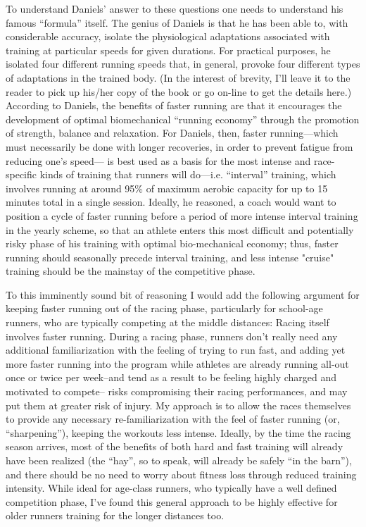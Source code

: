 To understand Daniels’ answer to these questions one needs to understand his famous “formula” itself. The genius of Daniels is that he has been able to, with considerable accuracy, isolate the physiological adaptations associated with training at particular speeds for given durations. For practical purposes, he isolated four different running speeds that, in general, provoke four different types of adaptations in the trained body. (In the interest of brevity, I’ll leave it to the reader to pick up his/her copy of the book or go on-line to get the details here.) According to Daniels, the benefits of faster running are that it encourages the development of optimal biomechanical “running economy” through the promotion of strength, balance and relaxation. For Daniels, then, faster running—which must necessarily be done with longer recoveries, in order to prevent fatigue from reducing one’s speed— is best used as a basis for the most intense and race-specific kinds of training that runners will do—i.e. “interval” training, which involves running at around 95\% of maximum aerobic capacity for up to 15 minutes total in a single session. Ideally, he reasoned, a coach would want to position a cycle of faster running before a period of more intense interval training in the yearly scheme, so that an athlete enters this most difficult and potentially risky phase of his training with optimal bio-mechanical economy; thus, faster running should seasonally precede interval training, and less intense "cruise" training should be the mainstay of the competitive phase.

To this imminently sound bit of reasoning I would add the following argument for keeping faster running out of the racing phase, particularly for school-age runners, who are typically competing at the middle distances: Racing itself involves faster running. During a racing phase, runners don’t really need any additional familiarization with the feeling of trying to run fast, and adding yet more faster running into the program while athletes are already running all-out once or twice per week--and tend as a result to be feeling highly charged and motivated to compete-- risks compromising their racing performances, and may put them at greater risk of injury. My approach is to allow the races themselves to provide any necessary re-familiarization with the feel of faster running (or, “sharpening”), keeping the workouts less intense. Ideally, by the time the racing season arrives, most of the benefits of both hard and fast training will already have been realized (the “hay”, so to speak, will already be safely “in the barn”), and there should be no need to worry about fitness loss through reduced training intensity. While ideal for age-class runners, who typically have a well defined competition phase, I've found this general approach to be highly effective for older runners training for the longer distances too.

